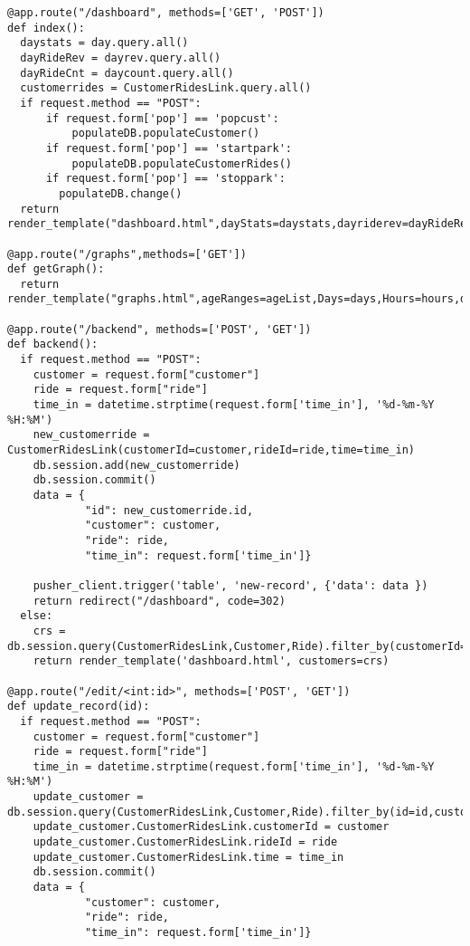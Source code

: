 \begin{verbatim}
@app.route("/dashboard", methods=['GET', 'POST'])
def index():
  daystats = day.query.all()
  dayRideRev = dayrev.query.all()
  dayRideCnt = daycount.query.all()
  customerrides = CustomerRidesLink.query.all()
  if request.method == "POST":
      if request.form['pop'] == 'popcust':
          populateDB.populateCustomer()
      if request.form['pop'] == 'startpark':
          populateDB.populateCustomerRides()
      if request.form['pop'] == 'stoppark':
        populateDB.change()
  return render_template("dashboard.html",dayStats=daystats,dayriderev=dayRideRev,dayridecnt=dayRideCnt,customerRides=customerrides,ageRanges=ageList,Days=days,Hours=hours,dates=datems,dayRevenue=dayrevenue,dayCount=daycunt,rideDates=ridedates,CR=cr,DRR=drr,DTR=dtr,FWR=fwr,GTR=gtr,RCR=rcr,WRR=wrr,SSR=ssr,CIR=cir,GR=gr,CC=cc,DRC=drc,DTC=dtc,FWC=fwc,GTC=gtc,RCC=rcc,WRC=wrc,SSC=ssc,CIC=cic,GC=gc)

@app.route("/graphs",methods=['GET'])
def getGraph():
  return render_template("graphs.html",ageRanges=ageList,Days=days,Hours=hours,dates=datems,dayRevenue=dayrevenue,dayCount=daycunt,rideDates=ridedates,CR=cr,DRR=drr,DTR=dtr,FWR=fwr,GTR=gtr,RCR=rcr,WRR=wrr,SSR=ssr,CIR=cir,GR=gr,CC=cc,DRC=drc,DTC=dtc,FWC=fwc,GTC=gtc,RCC=rcc,WRC=wrc,SSC=ssc,CIC=cic,GC=gc)

@app.route("/backend", methods=['POST', 'GET'])
def backend():
  if request.method == "POST":
    customer = request.form["customer"]
    ride = request.form["ride"]
    time_in = datetime.strptime(request.form['time_in'], '%d-%m-%Y %H:%M')
    new_customerride = CustomerRidesLink(customerId=customer,rideId=ride,time=time_in)
    db.session.add(new_customerride)
    db.session.commit()
    data = {
            "id": new_customerride.id,
            "customer": customer,
            "ride": ride,
            "time_in": request.form['time_in']}

    pusher_client.trigger('table', 'new-record', {'data': data })
    return redirect("/dashboard", code=302)
  else:
    crs = db.session.query(CustomerRidesLink,Customer,Ride).filter_by(customerId=Customer.id,rideId=Ride.id).all()
    return render_template('dashboard.html', customers=crs)

@app.route("/edit/<int:id>", methods=['POST', 'GET'])
def update_record(id):
  if request.method == "POST":
    customer = request.form["customer"]
    ride = request.form["ride"]
    time_in = datetime.strptime(request.form['time_in'], '%d-%m-%Y %H:%M')
    update_customer = db.session.query(CustomerRidesLink,Customer,Ride).filter_by(id=id,customerId=Customer.id,rideId=Ride.id).first()
    update_customer.CustomerRidesLink.customerId = customer
    update_customer.CustomerRidesLink.rideId = ride
    update_customer.CustomerRidesLink.time = time_in
    db.session.commit()
    data = {
            "customer": customer,
            "ride": ride,
            "time_in": request.form['time_in']}


\end{verbatim}
